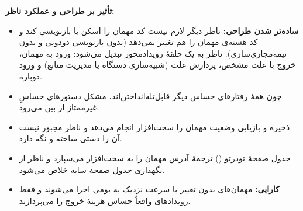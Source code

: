 \textbf{تأثیر بر طراحی و عملکرد ناظر:}
\begin{itemize}
  \item \textbf{ساده‌تر شدن طراحی:} ناظر دیگر لازم نیست کد مهمان را اسکن یا بازنویسی کند و کد هسته‌ی مهمان را هم تغییر نمی‌دهد (بدون بازنویسی دودویی و بدون نیمه‌مجازی‌سازی). ناظر به یک حلقهٔ رویدادمحور تبدیل می‌شود: ورود به مهمان، خروج با علت مشخص، پردازش علت (شبیه‌سازی دستگاه یا مدیریت منابع) و ورود دوباره.
  \item چون همهٔ رفتارهای حساس دیگر قابل‌تله‌انداختن‌اند، مشکل دستورهای حساسِ غیرممتاز از بین می‌رود.
  \item ذخیره و بازیابی وضعیت مهمان را سخت‌افزار انجام می‌دهد و ناظر مجبور نیست آن را دستی ساخته و نگه دارد.
  \item جدول صفحهٔ تودرتو () ترجمهٔ آدرس مهمان را به سخت‌افزار می‌سپارد و ناظر از نگهداری جدول صفحهٔ سایه خلاص می‌شود.
  \item \textbf{کارایی:} مهمان‌های بدون تغییر با سرعت نزدیک به بومی اجرا می‌شوند و فقط رویدادهای واقعاً حساس هزینهٔ خروج را می‌پردازند.
\end{itemize}

